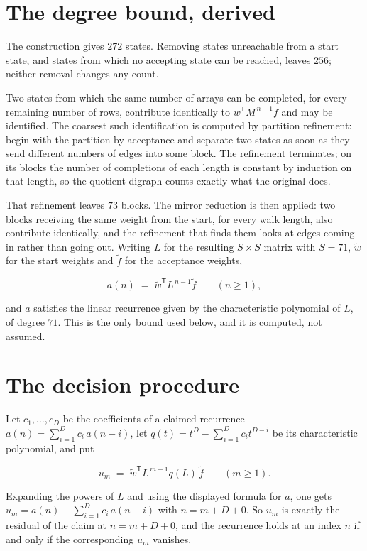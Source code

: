 \documentclass[11pt]{article}
\theoremstyle{definition}
\begin{document}
\section{The degree bound, derived}

The construction gives $272$ states. Removing states unreachable from a start state, and states from which no accepting state can be reached, leaves $256$; neither removal changes any count.

Two states from which the same number of arrays can be completed, for every remaining number of rows, contribute identically to $w^{\mathsf T}M^{\,n-1}f$ and may be identified. The coarsest such identification is computed by partition refinement: begin with the partition by acceptance and separate two states as soon as they send different numbers of edges into some block. The refinement terminates; on its blocks the number of completions of each length is constant by induction on that length, so the quotient digraph counts exactly what the original does.

That refinement leaves $73$ blocks. The mirror reduction is then applied: two blocks receiving the same weight from the start, for every walk length, also contribute identically, and the refinement that finds them looks at edges coming in rather than going out. Writing $L$ for the resulting $S \times S$ matrix with $S = 71$, $\tilde w$ for the start weights and $\tilde f$ for the acceptance weights,

\[a(n) \;=\; \tilde w^{\mathsf T} L^{\,n-1} \tilde f \qquad (n \ge 1),\]

and $a$ satisfies the linear recurrence given by the characteristic polynomial of $L$, of degree $71$. This is the only bound used below, and it is computed, not assumed.

\section{The decision procedure}

Let $c_1,\dots,c_D$ be the coefficients of a claimed recurrence $a(n) = \sum_{i=1}^{D} c_i\,a(n-i)$, let $q(t) = t^{D} - \sum_{i=1}^{D} c_i t^{D-i}$ be its characteristic polynomial, and put

\[u_m \;=\; \tilde w^{\mathsf T} L^{\,m-1} q(L)\,\tilde f \qquad (m \ge 1).\]

Expanding the powers of $L$ and using the displayed formula for $a$, one gets $u_m = a(n) - \sum_{i=1}^{D} c_i\,a(n-i)$ with $n = m + D + 0$. So $u_m$ is exactly the residual of the claim at $n = m + D + 0$, and the recurrence holds at an index $n$ if and only if the corresponding $u_m$ vanishes.
\end{document}
